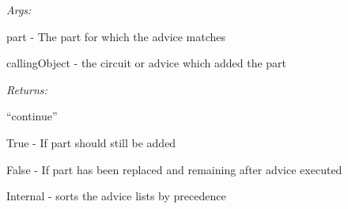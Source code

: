 \documentclass[letterpaper,10pt,english]{sphinxmanual}
\begin{document}
\begin{fulllineitems}
\begin{fulllineitems}
\begin{DUlineblock}{0em}
\item[] \emph{Args:}
\item[]
\begin{DUlineblock}{\DUlineblockindent}
\item[] part - The part for which the advice matches
\item[] callingObject - the circuit or advice which added the part
\end{DUlineblock}
\end{DUlineblock}

\begin{DUlineblock}{0em}
\item[] \emph{Returns:}
\item[]
\begin{DUlineblock}{\DUlineblockindent}
\item[] ``continue''
\item[] True - If part should still be added
\item[] False - If part has been replaced and remaining after advice executed
\end{DUlineblock}
\end{DUlineblock}

\end{fulllineitems}


\begin{fulllineitems}
\label{modules/index:aosb.core.Weaver.sortAdviceList}
Internal - sorts the advice lists by precedence

\end{fulllineitems}


\end{fulllineitems}

\end{document}
